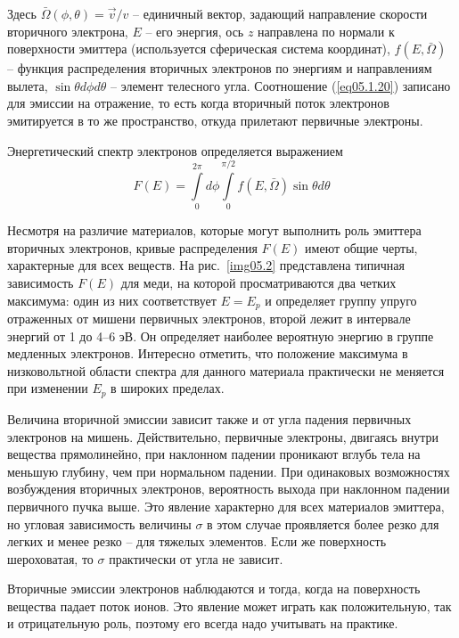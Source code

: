 Здесь \( \bar{\Omega}(\phi,\theta) = \vec{v}/v \) -- единичный вектор, 
задающий направление скорости вторичного электрона, \( E \) -- его энергия, 
ось \( z \)  направлена по нормали к поверхности эмиттера (используется 
сферическая система координат), \( f(E,\bar{\Omega}) \) -- функция 
распределения вторичных электронов по энергиям и направлениям 
вылета, \( \sin\theta d\phi d\theta \) -- элемент телесного угла. Соотношение 
(\ref{eq05.1.20}) записано для эмиссии на отражение, то есть когда вторичный 
поток электронов эмитируется в то же пространство, откуда прилетают первичные 
электроны.

Энергетический спектр электронов определяется выражением
\begin{equation}
    F(E) = \int\limits_{0}^{2\pi} d\phi 
        \int\limits_{0}^{\pi/2} f(E,\bar{\Omega}) \sin\theta d\theta
    \label{eq05.1.21}
\end{equation}

Несмотря на различие материалов, которые могут выполнить роль эмиттера 
вторичных электронов, кривые распределения \( F(E) \) имеют общие черты, 
характерные для всех веществ. На рис.~\ref{img05.2} представлена типичная 
зависимость \( F(E) \) для меди, на которой просматриваются два четких 
максимума: один из них соответствует \( E = E_p \) и определяет группу упруго 
отраженных от мишени первичных электронов, второй лежит в интервале энергий от 
1 до 4–6 эВ. Он определяет наиболее вероятную энергию в группе медленных 
электронов. Интересно отметить, что положение максимума в низковольтной 
области спектра  для  данного  материала практически не меняется при изменении 
\( E_p \) в широких пределах.

Величина вторичной эмиссии зависит также и от угла падения первичных 
электронов на мишень. Действительно, первичные электроны, двигаясь внутри 
вещества прямолинейно, при наклонном падении проникают вглубь тела на меньшую 
глубину, чем при нормальном падении. При одинаковых возможностях возбуждения 
вторичных электронов, вероятность выхода при наклонном падении первичного 
пучка выше. Это явление характерно для всех материалов эмиттера, но угловая 
зависимость величины \( \sigma \) в этом случае проявляется более резко для 
легких и менее резко -- для тяжелых элементов. Если же поверхность 
шероховатая, то \( \sigma \) практически от угла не зависит.

Вторичные эмиссии электронов наблюдаются и тогда, когда на поверхность 
вещества падает поток ионов. Это явление может играть как положительную, так 
и отрицательную роль, поэтому его всегда надо учитывать на практике.
